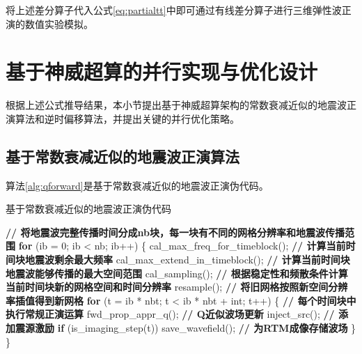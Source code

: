 \documentclass[degree=doctor]{thuthesis}
\begin{document}
将上述差分算子代入公式\ref{eq:partialtt}中即可通过有线差分算子进行三维弹性波正演的数值实验模拟。

\section{基于神威超算的并行实现与优化设计}

根据上述公式推导结果，本小节提出基于神威超算架构的常数衰减近似的地震波正演算法和逆时偏移算法，并提出关键的并行优化策略。

\subsection{基于常数衰减近似的地震波正演算法}
算法\ref{alg:qforward}是基于常数衰减近似的地震波正演伪代码。

\begin{algorithm}[ht]
\small
\caption{基于常数衰减近似的地震波正演伪代码} \label{alg:qforward}
\begin{algorithmic}[1]
\State \textbf{// 将地震波完整传播时间分成nb块，每一块有不同的网格分辨率和地震波传播范围}
\State \textbf{for} (ib = 0; ib < nb; ib++) \{ \label{ln:qfwdnb}
\State \quad\quad cal\_max\_freq\_for\_timeblock(); \textbf{// 计算当前时间块地震波剩余最大频率} \label{ln:calfreq}
\State \quad\quad cal\_max\_extend\_in\_timeblock(); \textbf{// 计算当前时间块地震波能够传播的最大空间范围} \label{ln:calextend}
\State \quad\quad cal\_sampling(); \textbf{// 根据稳定性和频散条件计算当前时间块新的网格空间和时间分辨率} \label{ln:calsampling}
\State \quad\quad resample(); \textbf{// 将旧网格按照新空间分辨率插值得到新网格} \label{ln:resample}
\State \quad\quad
\State \quad\quad \textbf{for} (t = ib * nbt; t < ib * nbt + int; t++) \{ \textbf{// 每个时间块中执行常规正演运算} \label{ln:tbbegin}
\State \quad\quad\quad\quad fwd\_prop\_appr\_q(); \textbf{// Q近似波场更新}
\State \quad\quad\quad\quad inject\_src(); \textbf{// 添加震源激励}
\State \quad\quad\quad\quad \textbf{if} (is\_imaging\_step(t))
\State \quad\quad\quad\quad\quad\quad save\_wavefield(); \textbf{// 为RTM成像存储波场} \label{ln:savewavefield}
\State \quad\quad \} \label{ln:tbend}
\State \} \label{ln:qfwdnbend}
\end{algorithmic}
\end{algorithm}
\end{document}
